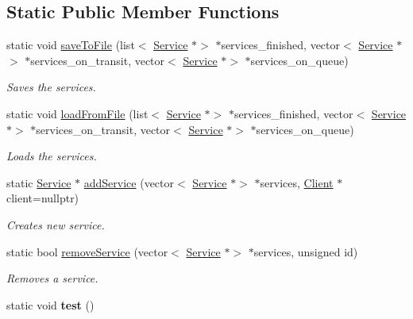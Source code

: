 \subsection*{Static Public Member Functions}
\begin{DoxyCompactItemize}
\item 
static void \hyperlink{class_service_aa3672a3a070ca951f5b66075a5d4c339}{save\+To\+File} (list$<$ \hyperlink{class_service}{Service} $\ast$$>$ $\ast$services\+\_\+finished, vector$<$ \hyperlink{class_service}{Service} $\ast$$>$ $\ast$services\+\_\+on\+\_\+transit, vector$<$ \hyperlink{class_service}{Service} $\ast$$>$ $\ast$services\+\_\+on\+\_\+queue)
\begin{DoxyCompactList}\small\item\em Saves the services. \end{DoxyCompactList}\item 
static void \hyperlink{class_service_add72b2a9e781bdb20a26bdff39952088}{load\+From\+File} (list$<$ \hyperlink{class_service}{Service} $\ast$$>$ $\ast$services\+\_\+finished, vector$<$ \hyperlink{class_service}{Service} $\ast$$>$ $\ast$services\+\_\+on\+\_\+transit, vector$<$ \hyperlink{class_service}{Service} $\ast$$>$ $\ast$services\+\_\+on\+\_\+queue)
\begin{DoxyCompactList}\small\item\em Loads the services. \end{DoxyCompactList}\item 
static \hyperlink{class_service}{Service} $\ast$ \hyperlink{class_service_a9e1aa933d52a23d5e265666bdedea0f1}{add\+Service} (vector$<$ \hyperlink{class_service}{Service} $\ast$$>$ $\ast$services, \hyperlink{class_client}{Client} $\ast$client=nullptr)
\begin{DoxyCompactList}\small\item\em Creates new service. \end{DoxyCompactList}\item 
static bool \hyperlink{class_service_af2ca48ced14708abeb5f92f10245241c}{remove\+Service} (vector$<$ \hyperlink{class_service}{Service} $\ast$$>$ $\ast$services, unsigned id)
\begin{DoxyCompactList}\small\item\em Removes a service. \end{DoxyCompactList}\item 
\mbox{\label{class_service_a6d403e206572e65bd132006602d5b193}} 
static void {\bfseries test} ()
\end{DoxyCompactItemize}
